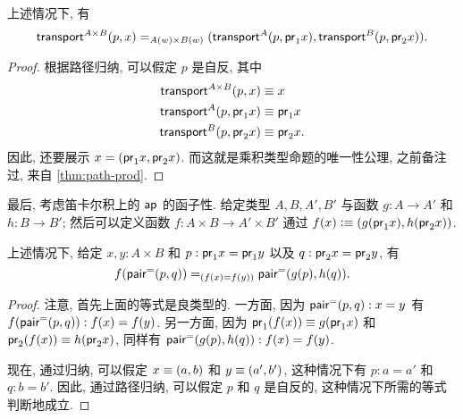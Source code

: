 \begin{thm}
    \label{thm:trans-prod}
    上述情况下, 有
    \[
        \id[A(w) \times B(w)]
            {\transfib{A\times B}px}
            {(\transfib{A}{p}{\proj{1}x}, \transfib{B}{p}{\proj{2}x})}.
    \]
\end{thm}
\begin{proof}
    根据路径归纳, 可以假定 $p$ 是自反, 其中
    \begin{align*}
        \transfib{A\times B}px&\jdeq x\\
        \transfib{A}{p}{\proj{1}x}&\jdeq \proj1x\\
        \transfib{B}{p}{\proj{2}x}&\jdeq \proj2x.
    \end{align*}
    因此, 还要展示 $x = (\proj1 x, \proj2x)$.
    而这就是乘积类型命题的唯一性公理, 之前备注过, 来自 \cref{thm:path-prod}.
\end{proof}

最后, 考虑笛卡尔积上的 $\apfunc{}$ 的函子性.
给定类型 $A,B,A',B'$ 与函数 $g:A\to A'$ 和 $h:B\to B'$;
然后可以定义函数 $f:A\times B\to A'\times B'$ 通过 $f(x) \defeq (g(\proj1x),h(\proj2x))$.

\begin{thm}
    \label{thm:ap-prod}
    上述情况下, 给定 $x,y:A\times B$ 和 $p:\proj1x=\proj1y$ 以及 $q:\proj2x=\proj2y$, 有
    \[ \id[(f(x)=f(y))]{\ap{f}{\pairpath(p,q)}} {\pairpath(\ap{g}{p},\ap{h}{q})}. \]
\end{thm}
\begin{proof}
    注意, 首先上面的等式是良类型的.
    一方面, 因为 $\pairpath(p,q):x=y$ 有 $\ap{f}{\pairpath(p,q)}:f(x)=f(y)$.
    另一方面, 因为 $\proj1(f(x))\jdeq g(\proj1x)$ 和 $\proj2(f(x))\jdeq h(\proj2x)$, 同样有 $\pairpath(\ap{g}{p},\ap{h}{q}):f(x)=f(y)$.

    现在, 通过归纳, 可以假定 $x\jdeq(a,b)$ 和 $y\jdeq(a',b')$, 这种情况下有 $p:a=a'$ 和 $q:b=b'$.
    因此, 通过路径归纳, 可以假定 $p$ 和 $q$ 是自反的, 这种情况下所需的等式判断地成立.
\end{proof}

%